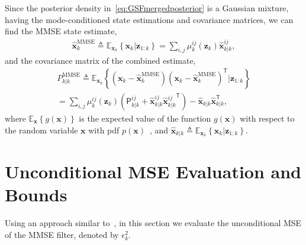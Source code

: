 \documentclass[10pt,twocolumn,twoside]{IEEEtran}
\newcommand{\tran}{^{\mathsf{T}}}
\newcommand{\expectx}{\mathds{E}_{\mathbf{x}_k}\!}
\newcommand{\xmmse}{\hat{\mathbf{{x}}}_{k}^{\mathrm{MMSE}}}
\newcommand{\Pmmse}{P_{k|k}^{\mathrm{MMSE}}}
\newcommand{\corcol}[1]{\textcolor{CorCol}{#1}}
\begin{document}
Since the posterior density in~\eqref{eq:GSFmergedposterior} is a Gaussian mixture, having the mode-conditioned state estimations and covariance matrices, we can find the MMSE state estimate, 
\begin{eqnarray}
\label{eq:MMSEStateestimate}
\xmmse \triangleq \expectx {\left\lbrace \mathbf{{x}}_{k} |\mathbf{{z}}_{1:k} \right\rbrace }
= \sum \limits _{i,j} \mu_{k}^{ij}{\left(\mathbf{z}_{k}\right)}\mathsf{\hat{\boldsymbol{x}}}_{k|k}^{ij}, 
\end{eqnarray}
and the covariance matrix of the combined estimate,
\begin{eqnarray}
\label{eq:MMSECov} \Pmmse \triangleq  \expectx{\left\lbrace \left(\mathbf{x}_{k}-\hat{\mathbf{{x}}}_{k}^{\mathrm{MMSE}}\right)\left(\mathbf{x}_{k}-\hat{\mathbf{{x}}}_{k}^{\mathrm{MMSE}}\right)\tran \big| \mathbf{{z}}_{1:k} \right\rbrace }\\ \label{eq:MMSECov2}
=  \sum \limits_{i,j}\mu_{k}^{ij}{\left(\mathbf{z}_{k}\right)} \left( \mathsf{P}_{k|k}^{ij} + \mathsf{\hat{\boldsymbol{x}}}_{k|k}^{ij} \mathsf{\hat{\boldsymbol{x}}}{_{k|k}^{ij}}\tran \right)- \mathsf{\hat{\boldsymbol{x}}}_{k|k}\mathsf{\hat{\boldsymbol{x}}}_{k|k}\tran,
\end{eqnarray}
where \(\mathds{E}_\mathbf{x}{\left\lbrace g{\left(\mathbf{{x}}\right)} \right\rbrace} \) is the expected value of the function \(g{\left(\mathbf{{x}}\right)}\) with respect to the random variable \(\mathbf{{x}}\) with pdf \(p{\left(\mathbf{{x}}\right)}\)~\cite{bar2001estimation}\corcol{, and \(\mathsf{\hat{\boldsymbol{x}}}_{k|k} \triangleq \expectx {\left\lbrace \mathbf{{x}}_{k} |\mathbf{{z}}_{1:k} \right\rbrace }\)}. 
\section{Unconditional MSE Evaluation and Bounds}
\label{sec:ContributionMSE}
Using an approach similar to~\cite{flam_mmse_2012}, in this section we evaluate the unconditional MSE of the MMSE filter, denoted by \(\epsilon_k ^2\).
\end{document}
